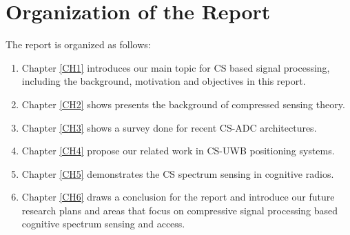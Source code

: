 \section{Organization of the Report}

The report is organized as follows:

\begin{enumerate}
\item Chapter \ref{CH1} introduces our main topic for CS based signal processing, including the background, motivation and objectives in this report.  
\item Chapter \ref{CH2} shows presents the background of
compressed sensing theory.
\item Chapter \ref{CH3} shows a survey done for recent CS-ADC architectures.
\item Chapter \ref{CH4} propose our related work in CS-UWB positioning systems.
\item Chapter \ref{CH5} demonstrates the CS spectrum sensing in cognitive radios.

\item Chapter \ref{CH6} draws a conclusion for the report and introduce our future research plans and areas that focus on compressive signal processing based cognitive spectrum sensing and access.
\end{enumerate}


